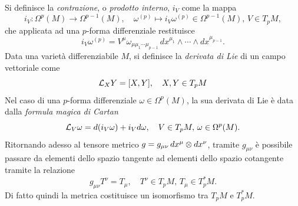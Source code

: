Si definisce la \emph{contrazione}, o \emph{prodotto interno}, $i_V$ come la mappa 
\begin{equation}
    i_V : \Omega^p(M) \to \Omega^{p - 1}(M),\quad \omega^{(p)} \mapsto i_V\omega^{(p)} \in \Omega^{p - 1}(M),\, V \in T_pM,
\end{equation}
che applicata ad una $p$-forma differenziale restituisce
\begin{equation}
    i_V\omega^{(p)} = V^\mu\omega_{\mu\mu_1\cdots\mu_{p - 1}}\,dx^{\mu_1}\wedge \cdots \wedge dx^{\mu_{p - 1}}.
\end{equation}
Data una varietà differenziabile $M$, si definisce la \emph{derivata di Lie} di un campo vettoriale come 
\begin{equation}
    \mathcal{L}_XY = [X,Y],\quad X,Y \in T_pM
\end{equation}
Nel caso di una $p$-forma differenziale $\omega \in \Omega^p(M)$, la sua derivata di Lie è data dalla \emph{formula magica di Cartan}
\begin{equation}
\label{eq: formula magica di Cartan}
    \mathcal{L}_V\omega = d(i_V\omega) + i_Vd\omega,\quad V \in T_pM,\,\omega \in \Omega^p(M).
\end{equation}
Ritornando adesso al tensore metrico $g = g_{\mu\nu}\,dx^\mu \otimes dx^\nu$, tramite $g_{\mu\nu}$ è possibile passare da elementi dello spazio tangente ad elementi dello spazio cotangente tramite la relazione 
\begin{equation}
    g_{\mu\nu}T^\nu = T_\mu,\quad T^\nu \in T_pM,\,T_\mu \in T_p^*M.
\end{equation}
Di fatto quindi la metrica costituisce un isomorfismo tra $T_pM$ e $T_p^*M$.

